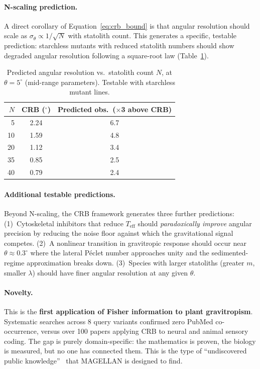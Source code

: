 \paragraph{N-scaling prediction.} A direct corollary of Equation~\ref{eq:crb_bound} is that angular resolution should scale as $\sigma_\theta \propto 1/\sqrt{N}$ with statolith count. This generates a specific, testable prediction: starchless mutants with reduced statolith numbers should show degraded angular resolution following a square-root law (Table~\ref{tab:crb_nscaling}).

\begin{table}[htbp]
\centering
\caption{Predicted angular resolution vs.\ statolith count $N$, at $\theta = 5^\circ$ (mid-range parameters). Testable with starchless mutant lines.}
\label{tab:crb_nscaling}
\small
\begin{tabular}{@{}rcc@{}}
\toprule
$N$ & \textbf{CRB ($^\circ$)} & \textbf{Predicted obs.\ ($\times$3 above CRB)} \\
\midrule
5 & 2.24 & 6.7 \\
10 & 1.59 & 4.8 \\
20 & 1.12 & 3.4 \\
35 & 0.85 & 2.5 \\
40 & 0.79 & 2.4 \\
\bottomrule
\end{tabular}
\end{table}

\paragraph{Additional testable predictions.} Beyond N-scaling, the CRB framework generates three further predictions: (1)~Cytoskeletal inhibitors that reduce $T_\text{eff}$ should \emph{paradoxically improve} angular precision by reducing the noise floor against which the gravitational signal competes. (2)~A nonlinear transition in gravitropic response should occur near $\theta \approx 0.3^\circ$ where the lateral P\'{e}clet number approaches unity and the sedimented-regime approximation breaks down. (3)~Species with larger statoliths (greater $m$, smaller $\lambda$) should have finer angular resolution at any given $\theta$.

\paragraph{Novelty.} This is the \textbf{first application of Fisher information to plant gravitropism}. Systematic searches across 8 query variants confirmed zero PubMed co-occurrence, versus over 100 papers applying CRB to neural and animal sensory coding. The gap is purely domain-specific: the mathematics is proven, the biology is measured, but no one has connected them. This is the type of ``undiscovered public knowledge''~\citep{swanson1986} that MAGELLAN is designed to find.

